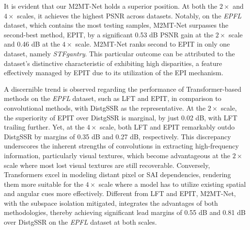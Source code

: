 It is evident that our M2MT-Net holds a superior position. At both the $2 \times$ and $4 \times$ scales, it achieves the highest PSNR across datasets. Notably, on the \textit{EPFL} dataset, which contains the most testing samples, M2MT-Net surpasses the second-best method, EPIT, by a significant 0.53 dB PSNR gain at the $2 \times$ scale and 0.46 dB at the $4 \times$ scale. M2MT-Net ranks second to EPIT in only one dataset, namely \textit{STFgantry}. This particular outcome can be attributed to the dataset's distinctive characteristic of exhibiting high disparities, a feature effectively managed by EPIT due to its utilization of the EPI mechanism.

A discernible trend is observed regarding the performance of Transformer-based methods on the \textit{EPFL} dataset, such as LFT and EPIT, in comparison to convolutional methods, with DistgSSR as the representative. At the $2 \times$ scale, the superiority of EPIT over DistgSSR is marginal, by just 0.02 dB, with LFT trailing further. Yet, at the $4 \times$ scale, both LFT and EPIT remarkably outdo DistgSSR by margins of 0.35 dB and 0.27 dB, respectively. This discrepancy underscores the inherent strengths of convolutions in extracting high-frequency information, particularly visual textures, which become advantageous at the $2 \times$ scale where most lost visual textures are still recoverable. Conversely, Transformers excel in modeling distant pixel or SAI dependencies, rendering them more suitable for the $4 \times$ scale where a model has to utilize existing spatial and angular cues more effectively. Different from LFT and EPIT, M2MT-Net, with the subspace isolation mitigated, integrates the advantages of both methodologies, thereby achieving significant lead margins of 0.55 dB and 0.81 dB over DistgSSR on the \textit{EPFL} dataset at both scales.

